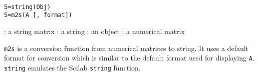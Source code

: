 
\begin{mandesc}
   \\
\end{mandesc}
\begin{calling_sequence}
\begin{verbatim}
S=string(Obj)
S=m2s(A [, format])
\end{verbatim}
\end{calling_sequence}

\begin{parameters}
  \begin{varlist}
     : a string matrix
     : a string 
     : an object 
     : a numerical matrix
  \end{varlist}
\end{parameters}
\begin{mandescription}
\verb+m2s+ is a conversion function from numerical matrices to string. 
It uses a default format for conversion which is similar to the default 
format used for displaying \verb+A+.
\verb+string+ emulates the Scilab \verb+string+ function.
\end{mandescription}

